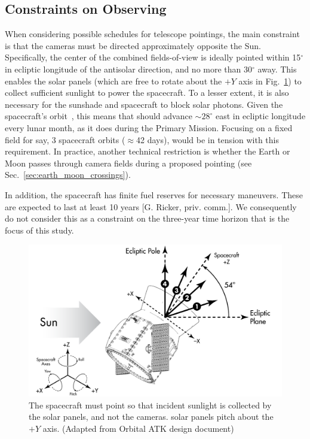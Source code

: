 \subsection{Constraints on \tesss Observing}
\label{sec:constraints_on_pointings}

When considering possible schedules for telescope pointings, the main
constraint is that the cameras must be directed approximately opposite
the Sun.  Specifically, the center of the combined fields-of-view is
ideally pointed within 15$^\circ$ in ecliptic longitude of the antisolar 
direction, and no more than 30$^\circ$ away.
This enables the solar panels (which are free to rotate
about the $+Y$ axis in Fig.~\ref{fig:spacecraft_angles}) to collect
sufficient sunlight to power the spacecraft.
To a lesser extent, it is also necessary for the sunshade and 
spacecraft to block solar photons.
Given the spacecraft's orbit~\citep{gangestad_high_2013},
this means that \tess should advance $\sim$$28^\circ$ east in ecliptic
longitude every lunar month, as it does during the Primary Mission.
Focusing on a fixed field for say, 3 spacecraft orbits ($\approx$42
days), would be in tension with this requirement.  In practice,
another technical restriction is whether the Earth or Moon passes
through \tesss camera fields during a proposed pointing (see
Sec.~\ref{sec:earth_moon_crossings}).

In addition, the spacecraft has finite fuel reserves for necessary maneuvers.
These are expected to last at least 10 years [G. Ricker, priv. comm.]. We 
consequently do not consider this as a constraint on the three-year time 
horizon that is the focus of this study.

\begin{figure}[!b]
	\centering
	\includegraphics{figures/spacecraft_angles_corr.pdf}
	\caption{The spacecraft must point so that incident sunlight is collected 
		by the solar panels, and not the cameras. \tesss solar panels pitch 
		about the $+Y$ axis. (Adapted from Orbital ATK design document) }
	\label{fig:spacecraft_angles}
\end{figure}
